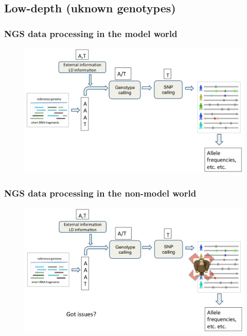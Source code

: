 
\subsection{Low-depth (uknown genotypes)}

\begin{frame}
\frametitle{NGS data processing in the \textbf{model} world}

	\begin{figure}
		\includegraphics[width=\textwidth]{Pics/ngs_1.png}
	\end{figure}

\end{frame}

\begin{frame}
\frametitle{NGS data processing in the \textbf{non-model} world}

	\begin{figure}
        	\includegraphics[width=\textwidth]{Pics/ngs_2.png}
	\end{figure}

\end{frame}

